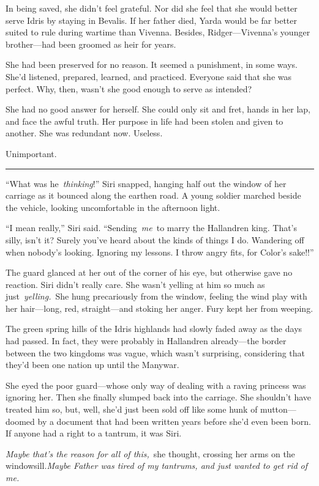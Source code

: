 In being saved, she didn’t feel grateful. Nor did she feel that she would better serve Idris by staying in Bevalis. If her father died, Yarda would be far better suited to rule during wartime than Vivenna. Besides, Ridger—Vivenna’s younger brother—had been groomed as heir for years.

She had been preserved for no reason. It seemed a punishment, in some ways. She’d listened, prepared, learned, and practiced. Everyone said that she was perfect. Why, then, wasn’t she good enough to serve as intended?

She had no good answer for herself. She could only sit and fret, hands in her lap, and face the awful truth. Her purpose in life had been stolen and given to another. She was redundant now. Useless.

Unimportant.

\bigskip \hrule \bigskip

“What was he~\textit{thinking}!” Siri snapped, hanging half out the window of her carriage as it bounced along the earthen road. A young soldier marched beside the vehicle, looking uncomfortable in the afternoon light.

“I mean really,” Siri said. “Sending~\textit{me}~to marry the Hallandren king. That’s silly, isn’t it? Surely you’ve heard about the kinds of things I do. Wandering off when nobody’s looking. Ignoring my lessons. I throw angry fits, for Color’s sake!!”

The guard glanced at her out of the corner of his eye, but otherwise gave no reaction. Siri didn’t really care. She wasn’t yelling at him so much as just~\textit{yelling.}~She hung precariously from the window, feeling the wind play with her hair—long, red, straight—and stoking her anger. Fury kept her from weeping.

The green spring hills of the Idris highlands had slowly faded away as the days had passed. In fact, they were probably in Hallandren already—the border between the two kingdoms was vague, which wasn’t surprising, considering that they’d been one nation up until the Manywar.

She eyed the poor guard—whose only way of dealing with a raving princess was ignoring her. Then she finally slumped back into the carriage. She shouldn’t have treated him so, but, well, she’d just been sold off like some hunk of mutton—doomed by a document that had been written years before she’d even been born. If anyone had a right to a tantrum, it was Siri.

\textit{Maybe that’s the reason for all of this,}~she thought, crossing her arms on the windowsill.\textit{Maybe Father was tired of my tantrums, and just wanted to get rid of me.}

